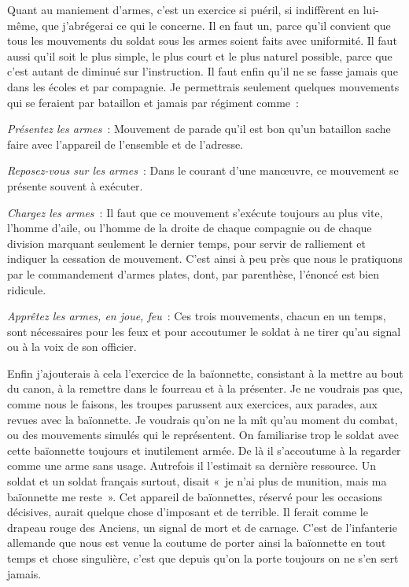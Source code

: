 \documentclass[french,twoside]{book} %
\begin{document}
Quant au maniement d’armes, c’est un exercice si puéril, si indiffèrent en lui-même, que j’abrégerai ce qui le concerne. Il en faut un, parce qu’il convient que tous les mouvements du soldat sous les armes soient faits avec uniformité. Il faut aussi qu’il soit le plus simple, le plus court et le plus naturel possible, parce que c’est autant de diminué sur l’instruction. Il faut enfin qu’il ne se fasse jamais que dans les écoles et par compagnie. Je permettrais seulement quelques mouvements qui se feraient par bataillon et jamais par régiment comme :\par
{\itshape Présentez les armes} : Mouvement de parade qu’il est bon qu’un bataillon sache faire avec l’appareil de l’ensemble et de l’adresse.\par
{\itshape Reposez-vous sur les armes} : Dans le courant d’une manœuvre, ce mouvement se présente souvent à exécuter.\par
{\itshape Chargez les armes} : Il faut que ce mouvement s’exécute toujours au plus vite, l’homme d’aile, ou l’homme de la droite de chaque compagnie ou de chaque division marquant seulement le dernier temps, pour servir de ralliement et indiquer la cessation de mouvement. C’est ainsi à peu près que nous le pratiquons par le commandement d’armes plates, dont, par parenthèse, l’énoncé est bien ridicule.\par
{\itshape Apprêtez les armes, en joue, feu} : Ces trois mouvements, chacun en un temps, sont nécessaires pour les feux et pour accoutumer le soldat à ne tirer qu’au signal ou à la voix de son officier.\par
Enfin j’ajouterais à cela l’exercice de la baïonnette, consistant à la mettre au bout du canon, à la remettre dans le fourreau et à la présenter. Je ne voudrais pas que, comme nous le faisons, les troupes parussent aux exercices, aux parades, aux revues avec la baïonnette. Je voudrais qu’on ne la mît qu’au moment du combat, ou des mouvements simulés qui le représentent. On familiarise trop le soldat avec cette baïonnette toujours et inutilement armée. De là il s’accoutume à la regarder comme une arme sans usage. Autrefois il l’estimait sa dernière ressource. Un soldat et un soldat français surtout, disait « je n’ai plus de munition, mais ma baïonnette me reste ». Cet appareil de baïonnettes, réservé pour les occasions décisives, aurait quelque chose d’imposant et de terrible. Il ferait comme le drapeau rouge des Anciens, un signal de mort et de carnage. C’est de l’infanterie allemande que nous est venue la coutume de porter ainsi la baïonnette en tout temps et chose singulière, c’est que depuis qu’on la porte toujours on ne s’en sert jamais.\par
\end{document}
